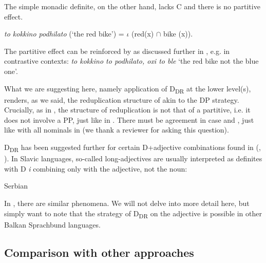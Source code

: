 \documentclass[output=paper,
modfonts
]{langscibook}
\begin{document}
The simple monadic definite, on the other hand, lacks C and there is no partitive effect.

\ea\label{ex:etxeberria:51}
	\textit{to kokkino podhilato} (`the red bike') = $\iota$ (red(x) $\cap$ bike (x)). 
\z

The partitive effect can be reinforced by  as discussed further in \citet{kolliakou2004}, e.g. in contrastive contexts: \textit{to kokkino to podhilato, oxi to ble} `the red bike not the blue one'. 

What we are suggesting here, namely application of D\textsubscript{DR} at the lower level(s), renders, as we said, the reduplication structure of  akin to the  DP strategy. Crucially, as in , the structure of reduplication is not that of a partitive, i.e. it does not involve a PP, just like in . There must be agreement in case and , just like with all nominals in  (we thank a reviewer for asking this question). 

D\textsubscript{DR} has been suggested further for certain D+adjective combinations found in  (\citealt{schurcks2014}, \citealt{marusic-zaucer2014}). In Slavic languages, so-called long-adjectives are usually interpreted as definites with D \textit{i} combining only with the adjective, not the noun:

\ea\label{ex:etxeberria:52}
Serbian
\z
\z

In , there are similar phenomena. We will not delve into more detail here, but simply want to note that the strategy of D\textsubscript{DR} on the adjective is possible in other Balkan Sprachbund languages.

\subsection{Comparison with other approaches}
\end{document}
